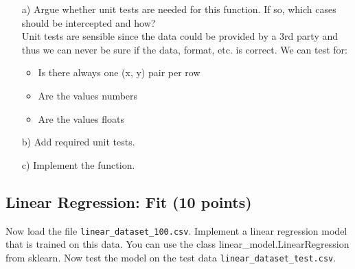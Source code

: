 \begin{enumerate}

\item[a)] Argue whether unit tests are needed for this function. If so, which cases should be intercepted and how? \\
Unit tests are sensible since the data could be provided by a 3rd party and thus we can never be sure if the data, format, etc. is correct.
We can test for:
\begin{itemize}
    \item Is there always one (x, y) pair per row
    \item Are the values numbers
    \item Are the values floats
\end{itemize}

\item[b)] Add required unit tests.

\item[c)] Implement the function.

\end{enumerate}

\subsection{Linear Regression: Fit (10 points)}

Now load the file \texttt{linear\_dataset\_100.csv}. Implement a linear regression model that is trained on this data. You can use the class linear\_model.LinearRegression from sklearn. Now test the model on the test data \texttt{linear\_dataset\_test.csv}.

